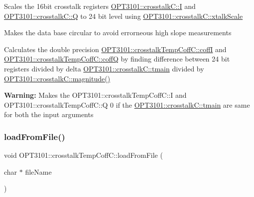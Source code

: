 \begin{DoxyItemize}
\item Scales the 16bit crosstalk registers \mbox{\hyperlink{class_o_p_t3101_1_1crosstalk_c_a97152b209288a0dc30c4158fdc1815fc}{O\+P\+T3101\+::crosstalk\+C\+::I}} and \mbox{\hyperlink{class_o_p_t3101_1_1crosstalk_c_a1e20d913baf2432ec90fe06a45c226db}{O\+P\+T3101\+::crosstalk\+C\+::Q}} to 24 bit level using \mbox{\hyperlink{class_o_p_t3101_1_1crosstalk_c_a5a5c560e1f5db427c02863a9618d9fa4}{O\+P\+T3101\+::crosstalk\+C\+::xtalk\+Scale}}
\item Makes the data base circular to avoid errorneous high slope measurements
\item Calculates the double precision \mbox{\hyperlink{class_o_p_t3101_1_1crosstalk_temp_coff_c_ae4687a0b6bdbea7cd4fa1581e5e9cf24}{O\+P\+T3101\+::crosstalk\+Temp\+Coff\+C\+::coffI}} and \mbox{\hyperlink{class_o_p_t3101_1_1crosstalk_temp_coff_c_a468edb62fe09f0117c59ed5c2ec11e3b}{O\+P\+T3101\+::crosstalk\+Temp\+Coff\+C\+::coffQ}} by finding difference between 24 bit registers divided by delta \mbox{\hyperlink{class_o_p_t3101_1_1crosstalk_c_a8b7250b531e953587c665c2c43860d82}{O\+P\+T3101\+::crosstalk\+C\+::tmain}} divided by \mbox{\hyperlink{class_o_p_t3101_1_1crosstalk_c_a3f569027c07fb3fb49a02ae3108e34c1}{O\+P\+T3101\+::crosstalk\+C\+::magnitude()}}
\item {\bfseries Warning\+:} Makes the O\+P\+T3101\+::crosstalk\+Temp\+Coff\+C\+::I and O\+P\+T3101\+::crosstalk\+Temp\+Coff\+C\+::Q 0 if the \mbox{\hyperlink{class_o_p_t3101_1_1crosstalk_c_a8b7250b531e953587c665c2c43860d82}{O\+P\+T3101\+::crosstalk\+C\+::tmain}} are same for both the input arguments 
\end{DoxyItemize}\mbox{\label{class_o_p_t3101_1_1crosstalk_temp_coff_c_ae7028582197d0c77e9cf990dab888f1e}} 
\subsubsection{\texorpdfstring{load\+From\+File()}{loadFromFile()}}
{\footnotesize\ttfamily void O\+P\+T3101\+::crosstalk\+Temp\+Coff\+C\+::load\+From\+File (\begin{DoxyParamCaption}\item[{char $\ast$}]{file\+Name }\end{DoxyParamCaption})}



